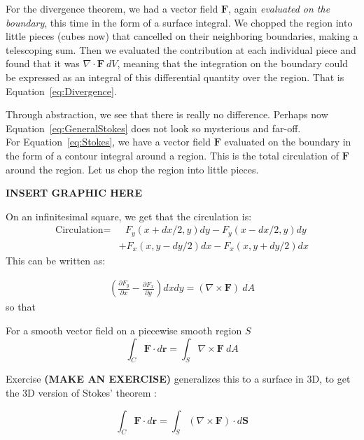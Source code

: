 	For the divergence theorem, we had a vector field $\mathbf F$, again \emph{evaluated on the boundary}, this time in the form of a surface integral. We chopped the region into little pieces (cubes now) that cancelled on their neighboring boundaries, making a telescoping sum. Then we evaluated the contribution at each individual piece and found that it was $\nabla \cdot \mathbf F ~ dV$, meaning that the integration on the boundary could  be expressed as an integral of this differential quantity over the region. That is Equation~\eqref{eq:Divergence}.
	
	
	Through abstraction, we see that there is really no difference. Perhaps now Equation~\eqref{eq:GeneralStokes} does not look so mysterious and far-off.\\
	
	For Equation~\eqref{eq:Stokes}, we have a vector field $\mathbf F$ evaluated on the boundary in the form of a contour integral around a region. This is the total circulation of $\mathbf{F}$ around the region. Let us chop the region into little pieces. 
	
	\textbf{INSERT GRAPHIC HERE}
	
	On an infinitesimal square, we get that the circulation is:
	\begin{align*}
		\text{Circulation} =& ~~~  F_y (x+dx/2,y) dy - F_y (x-dx/2,y) dy \\ &+  F_x (x,y-dy/2) dx - F_x (x,y+dy/2) dx
	\end{align*}
	This can be written as:
	
	\begin{align*}
		\left( \frac{\partial F_y}{\partial x} - \frac{\partial F_x}{\partial y} \right) dx dy = (\nabla \times \mathbf F) ~ dA
	\end{align*}
	so that
	\begin{theorem} For a smooth vector field on a piecewise smooth region $S$ 
		\begin{equation}
			\int_C \mathbf{F} \cdot d\mathbf r = \int_S \nabla \times \mathbf{F} ~ dA
		\end{equation}
	\end{theorem}
	Exercise \textbf{(MAKE AN EXERCISE)} generalizes this to a surface in 3D, to get the 3D version of Stokes' theorem :
	
	\begin{equation}
		\int_C \mathbf{F} \cdot d\mathbf r = \int_S (\nabla \times \mathbf{F}) \cdot d\mathbf S 
	\end{equation}
	

